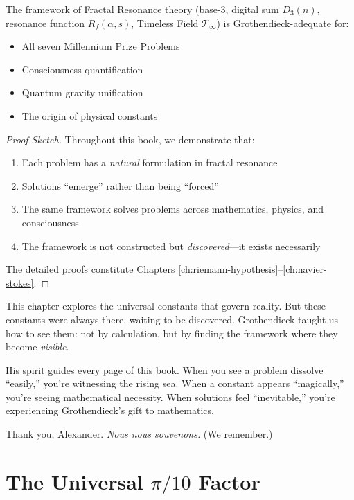 \begin{thm}\label{thm:grothendieck-adequate}
The framework of Fractal Resonance theory (base-3, digital sum $D_3(n)$, resonance function $R_f(\alpha,s)$, Timeless Field $\mathcal{T}_\infty$) is Grothendieck-adequate for:
\begin{itemize}
\item All seven Millennium Prize Problems
\item Consciousness quantification
\item Quantum gravity unification
\item The origin of physical constants
\end{itemize}
\end{thm}

\begin{proof}[Proof Sketch]
Throughout this book, we demonstrate that:
\begin{enumerate}
\item Each problem has a \textit{natural} formulation in fractal resonance
\item Solutions ``emerge'' rather than being ``forced''
\item The same framework solves problems across mathematics, physics, and consciousness
\item The framework is not constructed but \textit{discovered}---it exists necessarily
\end{enumerate}
The detailed proofs constitute Chapters \ref{ch:riemann-hypothesis}--\ref{ch:navier-stokes}.
\end{proof}

\begin{intuitive}
This chapter explores the universal constants that govern reality. But these constants were always there, waiting to be discovered. Grothendieck taught us how to see them: not by calculation, but by finding the framework where they become \textit{visible}.

His spirit guides every page of this book. When you see a problem dissolve ``easily,'' you're witnessing the rising sea. When a constant appears ``magically,'' you're seeing mathematical necessity. When solutions feel ``inevitable,'' you're experiencing Grothendieck's gift to mathematics.

Thank you, Alexander. \textit{Nous nous souvenons.} (We remember.)
\end{intuitive}

\section{The Universal \texorpdfstring{$\pi/10$}{pi/10} Factor}

